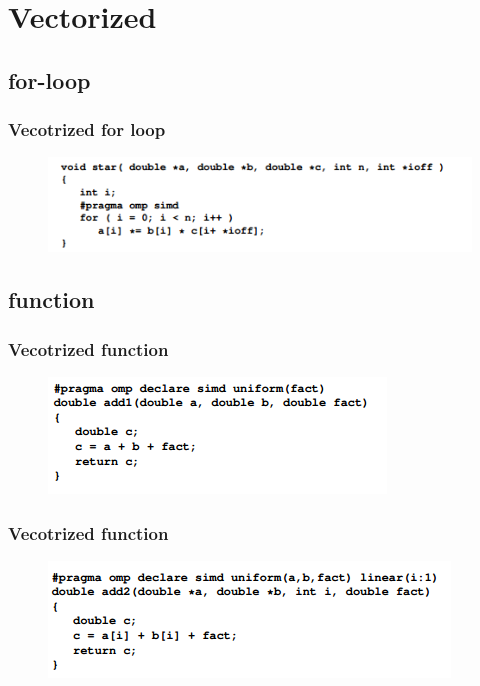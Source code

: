 \section{Vectorized}
\subsection{for-loop}
\begin{frame}
    \frametitle{Vecotrized for loop}
    \begin{figure}
		\includegraphics[scale=0.6]{figure/simd1.png}
	\end{figure}
\end{frame}
\subsection{function}
\begin{frame}
    \frametitle{Vecotrized function}
    \begin{figure}
		\includegraphics[scale=0.6]{figure/add1.png}
	\end{figure}
\end{frame}
\begin{frame}
    \frametitle{Vecotrized function}
    \begin{figure}
		\includegraphics[scale=0.6]{figure/add2.png}
	\end{figure}
\end{frame}


